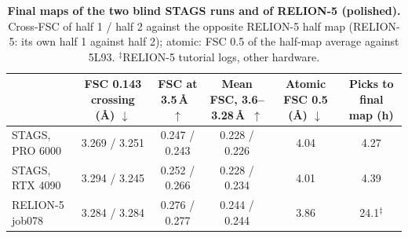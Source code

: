 \begin{table}[t]
\centering
\footnotesize
\setlength{\tabcolsep}{5pt}
\begin{tabular}{@{}lccccc@{}}
\toprule
& FSC 0.143 crossing (\AA) $\downarrow$ & FSC at 3.5\,\AA\ $\uparrow$ & Mean FSC, 3.6--3.28\,\AA\ $\uparrow$ & Atomic FSC 0.5 (\AA) $\downarrow$ & Picks to final map (h) \\
\midrule
STAGS, PRO 6000 & 3.269 / 3.251 & 0.247 / 0.243 & 0.228 / 0.226 & 4.04 & 4.27 \\
STAGS, RTX 4090 & 3.294 / 3.245 & 0.252 / 0.266 & 0.228 / 0.234 & 4.01 & 4.39 \\
RELION-5 job078 & 3.284 / 3.284 & 0.276 / 0.277 & 0.244 / 0.244 & 3.86 & 24.1$^\ddagger$ \\
\bottomrule
\end{tabular}
\caption{\textbf{Final maps of the two blind STAGS runs and of RELION-5 (polished).} Cross-FSC of half 1 / half 2 against the opposite RELION-5 half map (RELION-5: its own half 1 against half 2); atomic: FSC 0.5 of the half-map average against 5L93. $^\ddagger$RELION-5 tutorial logs, other hardware.}
\label{tab:suppl:runs}
\end{table}

